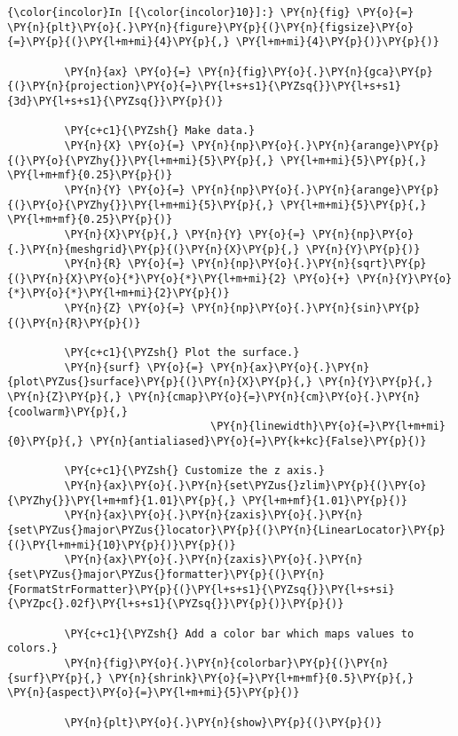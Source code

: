     \begin{Verbatim}[commandchars=\\\{\}]
{\color{incolor}In [{\color{incolor}10}]:} \PY{n}{fig} \PY{o}{=} \PY{n}{plt}\PY{o}{.}\PY{n}{figure}\PY{p}{(}\PY{n}{figsize}\PY{o}{=}\PY{p}{(}\PY{l+m+mi}{4}\PY{p}{,} \PY{l+m+mi}{4}\PY{p}{)}\PY{p}{)}
         
         \PY{n}{ax} \PY{o}{=} \PY{n}{fig}\PY{o}{.}\PY{n}{gca}\PY{p}{(}\PY{n}{projection}\PY{o}{=}\PY{l+s+s1}{\PYZsq{}}\PY{l+s+s1}{3d}\PY{l+s+s1}{\PYZsq{}}\PY{p}{)}
         
         \PY{c+c1}{\PYZsh{} Make data.}
         \PY{n}{X} \PY{o}{=} \PY{n}{np}\PY{o}{.}\PY{n}{arange}\PY{p}{(}\PY{o}{\PYZhy{}}\PY{l+m+mi}{5}\PY{p}{,} \PY{l+m+mi}{5}\PY{p}{,} \PY{l+m+mf}{0.25}\PY{p}{)}
         \PY{n}{Y} \PY{o}{=} \PY{n}{np}\PY{o}{.}\PY{n}{arange}\PY{p}{(}\PY{o}{\PYZhy{}}\PY{l+m+mi}{5}\PY{p}{,} \PY{l+m+mi}{5}\PY{p}{,} \PY{l+m+mf}{0.25}\PY{p}{)}
         \PY{n}{X}\PY{p}{,} \PY{n}{Y} \PY{o}{=} \PY{n}{np}\PY{o}{.}\PY{n}{meshgrid}\PY{p}{(}\PY{n}{X}\PY{p}{,} \PY{n}{Y}\PY{p}{)}
         \PY{n}{R} \PY{o}{=} \PY{n}{np}\PY{o}{.}\PY{n}{sqrt}\PY{p}{(}\PY{n}{X}\PY{o}{*}\PY{o}{*}\PY{l+m+mi}{2} \PY{o}{+} \PY{n}{Y}\PY{o}{*}\PY{o}{*}\PY{l+m+mi}{2}\PY{p}{)}
         \PY{n}{Z} \PY{o}{=} \PY{n}{np}\PY{o}{.}\PY{n}{sin}\PY{p}{(}\PY{n}{R}\PY{p}{)}
         
         \PY{c+c1}{\PYZsh{} Plot the surface.}
         \PY{n}{surf} \PY{o}{=} \PY{n}{ax}\PY{o}{.}\PY{n}{plot\PYZus{}surface}\PY{p}{(}\PY{n}{X}\PY{p}{,} \PY{n}{Y}\PY{p}{,} \PY{n}{Z}\PY{p}{,} \PY{n}{cmap}\PY{o}{=}\PY{n}{cm}\PY{o}{.}\PY{n}{coolwarm}\PY{p}{,}
                                \PY{n}{linewidth}\PY{o}{=}\PY{l+m+mi}{0}\PY{p}{,} \PY{n}{antialiased}\PY{o}{=}\PY{k+kc}{False}\PY{p}{)}
         
         \PY{c+c1}{\PYZsh{} Customize the z axis.}
         \PY{n}{ax}\PY{o}{.}\PY{n}{set\PYZus{}zlim}\PY{p}{(}\PY{o}{\PYZhy{}}\PY{l+m+mf}{1.01}\PY{p}{,} \PY{l+m+mf}{1.01}\PY{p}{)}
         \PY{n}{ax}\PY{o}{.}\PY{n}{zaxis}\PY{o}{.}\PY{n}{set\PYZus{}major\PYZus{}locator}\PY{p}{(}\PY{n}{LinearLocator}\PY{p}{(}\PY{l+m+mi}{10}\PY{p}{)}\PY{p}{)}
         \PY{n}{ax}\PY{o}{.}\PY{n}{zaxis}\PY{o}{.}\PY{n}{set\PYZus{}major\PYZus{}formatter}\PY{p}{(}\PY{n}{FormatStrFormatter}\PY{p}{(}\PY{l+s+s1}{\PYZsq{}}\PY{l+s+si}{\PYZpc{}.02f}\PY{l+s+s1}{\PYZsq{}}\PY{p}{)}\PY{p}{)}
         
         \PY{c+c1}{\PYZsh{} Add a color bar which maps values to colors.}
         \PY{n}{fig}\PY{o}{.}\PY{n}{colorbar}\PY{p}{(}\PY{n}{surf}\PY{p}{,} \PY{n}{shrink}\PY{o}{=}\PY{l+m+mf}{0.5}\PY{p}{,} \PY{n}{aspect}\PY{o}{=}\PY{l+m+mi}{5}\PY{p}{)}
         
         \PY{n}{plt}\PY{o}{.}\PY{n}{show}\PY{p}{(}\PY{p}{)}
\end{Verbatim}


